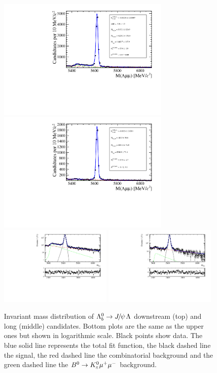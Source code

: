 \begin{figure}
\centering
\includegraphics[width=0.75\textwidth]{Lmumu/figs/MassFits/Lb2JpsiL__DD_data.pdf}
\includegraphics[width=0.75\textwidth]{Lmumu/figs/MassFits/Lb2JpsiL__LL_data.pdf}
\includegraphics[width=0.49\textwidth]{Lmumu/figs/MassFits/Lb2JpsiL_DD_data_log_fitAndRes.pdf}
\includegraphics[width=0.49\textwidth]{Lmumu/figs/MassFits/Lb2JpsiL_LL_data_log_fitAndRes.pdf}
\caption{Invariant mass distribution of $\Lb\ra\jpsi\Lz$ downstream (top) and long (middle) candidates.
Bottom plots are the same as the upper ones but shown in logarithmic scale. Black points show data.
The blue solid line represents the total fit function, the black dashed line the signal, the red dashed line
the combinatorial background and the green dashed line the $B^0\rightarrow K^0_{\rm\scriptscriptstyle S}\mu^+\mu^-$ background.}
\label{fig:Lb_totalFit}
\end{figure}
